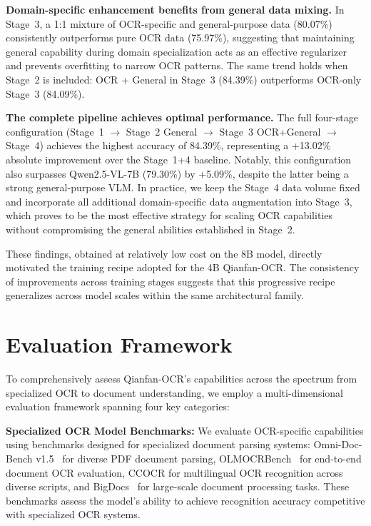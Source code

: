 \documentclass[dvipsnames]{article}
\begin{document}
\textbf{Domain-specific enhancement benefits from general data mixing.} In Stage~3, a 1:1 mixture of OCR-specific and general-purpose data (80.07\%) consistently outperforms pure OCR data (75.97\%), suggesting that maintaining general capability during domain specialization acts as an effective regularizer and prevents overfitting to narrow OCR patterns. The same trend holds when Stage~2 is included: OCR + General in Stage~3 (84.39\%) outperforms OCR-only Stage~3 (84.09\%).

\textbf{The complete pipeline achieves optimal performance.} The full four-stage configuration (Stage~1 $\rightarrow$ Stage~2 General $\rightarrow$ Stage~3 OCR+General $\rightarrow$ Stage~4) achieves the highest accuracy of 84.39\%, representing a +13.02\% absolute improvement over the Stage~1+4 baseline. Notably, this configuration also surpasses Qwen2.5-VL-7B (79.30\%) by +5.09\%, despite the latter being a strong general-purpose VLM. In practice, we keep the Stage~4 data volume fixed and incorporate all additional domain-specific data augmentation into Stage~3, which proves to be the most effective strategy for scaling OCR capabilities without compromising the general abilities established in Stage~2.

These findings, obtained at relatively low cost on the 8B model, directly motivated the training recipe adopted for the 4B Qianfan-OCR. The consistency of improvements across training stages suggests that this progressive recipe generalizes across model scales within the same architectural family.

\section{Evaluation Framework}
\label{sec:evaluation_framework}

To comprehensively assess Qianfan-OCR's capabilities across the spectrum from specialized OCR to document understanding, we employ a multi-dimensional evaluation framework spanning four key categories:

\textbf{Specialized OCR Model Benchmarks:}
We evaluate OCR-specific capabilities using benchmarks designed for specialized document parsing systems: Omni-Doc-Bench v1.5~\citep{ouyang2024omnidocbench} for diverse PDF document parsing, OLMOCRBench~\citep{olmocr2024} for end-to-end document OCR evaluation, CCOCR for multilingual OCR recognition across diverse scripts, and BigDocs~\citep{rodriguez2024bigdocs} for large-scale document processing tasks.
These benchmarks assess the model's ability to achieve recognition accuracy competitive with specialized OCR systems.
\end{document}
